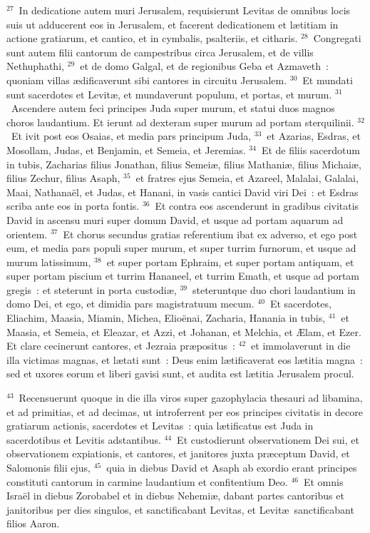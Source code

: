 ${}^{27}$~In dedicatione autem muri Jerusalem, requisierunt Levitas de omnibus locis suis ut adducerent eos in Jerusalem, et facerent dedicationem et l\ae titiam in actione gratiarum, et cantico, et in cymbalis, psalteriis, et citharis.
${}^{28}$~Congregati sunt autem filii cantorum de campestribus circa Jerusalem, et de villis Nethuphathi,
${}^{29}$~et de domo Galgal, et de regionibus Geba et Azmaveth~: quoniam villas \ae dificaverunt sibi cantores in circuitu Jerusalem.
${}^{30}$~Et mundati sunt sacerdotes et Levit\ae , et mundaverunt populum, et portas, et murum.
${}^{31}$~Ascendere autem feci principes Juda super murum, et statui duos magnos choros laudantium. Et ierunt ad dexteram super murum ad portam sterquilinii.
${}^{32}$~Et ivit post eos Osaias, et media pars principum Juda,
${}^{33}$~et Azarias, Esdras, et Mosollam, Judas, et Benjamin, et Semeia, et Jeremias.
${}^{34}$~Et de filiis sacerdotum in tubis, Zacharias filius Jonathan, filius Semei\ae , filius Mathani\ae , filius Michai\ae , filius Zechur, filius Asaph,
${}^{35}$~et fratres ejus Semeia, et Azareel, Malalai, Galalai, Maai, Nathana\"el, et Judas, et Hanani, in vasis cantici David viri Dei~: et Esdras scriba ante eos in porta fontis.
${}^{36}$~Et contra eos ascenderunt in gradibus civitatis David in ascensu muri super domum David, et usque ad portam aquarum ad orientem.
${}^{37}$~Et chorus secundus gratias referentium ibat ex adverso, et ego post eum, et media pars populi super murum, et super turrim furnorum, et usque ad murum latissimum,
${}^{38}$~et super portam Ephraim, et super portam antiquam, et super portam piscium et turrim Hananeel, et turrim Emath, et usque ad portam gregis~: et steterunt in porta custodi\ae ,
${}^{39}$~steteruntque duo chori laudantium in domo Dei, et ego, et dimidia pars magistratuum mecum.
${}^{40}$~Et sacerdotes, Eliachim, Maasia, Miamin, Michea, Elio\"enai, Zacharia, Hanania in tubis,
${}^{41}$~et Maasia, et Semeia, et Eleazar, et Azzi, et Johanan, et Melchia, et \AE lam, et Ezer. Et clare cecinerunt cantores, et Jezraia pr\ae positus~:
${}^{42}$~et immolaverunt in die illa victimas magnas, et l\ae tati sunt~: Deus enim l\ae tificaverat eos l\ae titia magna~: sed et uxores eorum et liberi gavisi sunt, et audita est l\ae titia Jerusalem procul.


${}^{43}$~Recensuerunt quoque in die illa viros super gazophylacia thesauri ad libamina, et ad primitias, et ad decimas, ut introferrent per eos principes civitatis in decore gratiarum actionis, sacerdotes et Levitas~: quia l\ae tificatus est Juda in sacerdotibus et Levitis adstantibus.
${}^{44}$~Et custodierunt observationem Dei sui, et observationem expiationis, et cantores, et janitores juxta pr\ae ceptum David, et Salomonis filii ejus,
${}^{45}$~quia in diebus David et Asaph ab exordio erant principes constituti cantorum in carmine laudantium et confitentium Deo.
${}^{46}$~Et omnis Isra\"el in diebus Zorobabel et in diebus Nehemi\ae , dabant partes cantoribus et janitoribus per dies singulos, et sanctificabant Levitas, et Levit\ae\ sanctificabant filios Aaron.

